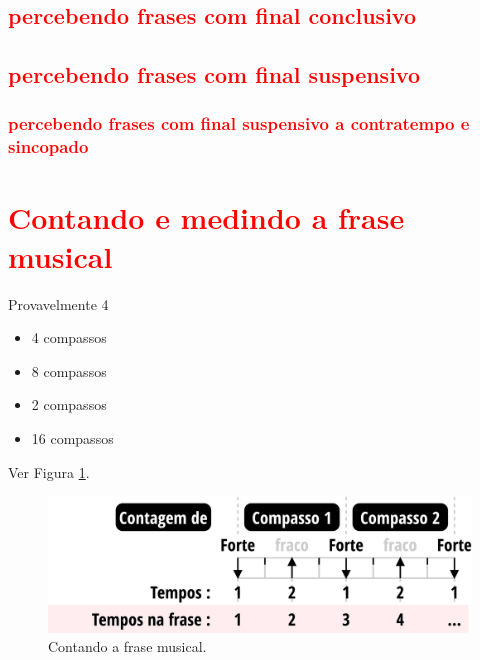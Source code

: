 \subsection{\textcolor{red}{percebendo frases com final conclusivo}}

\subsection{\textcolor{red}{percebendo frases com final suspensivo}}


\subsubsection{\textcolor{red}{percebendo frases com final suspensivo a contratempo e sincopado}}

\section{\textcolor{red}{Contando e medindo a frase musical}}
Provavelmente 4
\begin{itemize}
\item 4 compassos
\item 8 compassos
\item 2 compassos
\item 16 compassos
\end{itemize}


Ver Figura \ref{fig:contagemtemposfrase}.
\begin{figure}
    \centering
    \includegraphics[width=\textwidth]{chapters/cap-musica-musicalidade/contagemtemposfrase.eps}
    \caption{Contando a frase musical.}
    \label{fig:contagemtemposfrase}
\end{figure}

